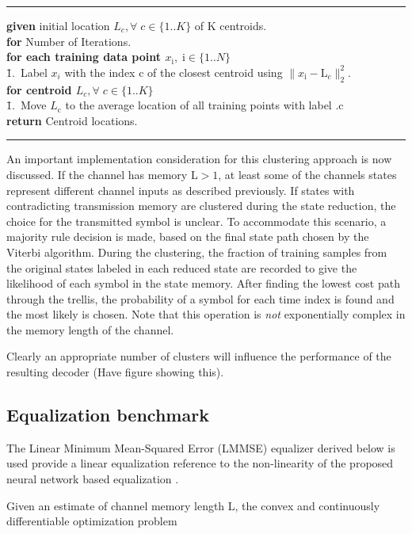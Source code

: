     \noindent\rule[10pt]{\textwidth}{0.4pt}
    {\footnotesize
    \begin{tabbing}
    {\bf given} initial location $L_c, \forall \;c  \in \{1..K\}$ of K centroids.\\
        {\textbf{for} Number of Iterations}.\\
         \qquad \= {\bf for each training data point $x_{\mathrm{i}}, \;\mathrm{i}  \in \{1..N\}$}\\
        \qquad \qquad \= 1.\ Label $x_i$ with the index c of the closest centroid using $\|x_{\mathrm{i}}- \text{L}_c\|^2_2$. \\
        \qquad \= {\bf for centroid $L_c, \forall \;c  \in \{1..K\}$}\\
                \qquad \qquad \= 1.\ Move $L_{\mathrm{c}}$ to the average location of all training points with label .c\\


        {\bf return} Centroid locations.
    \end{tabbing}}
    \noindent\rule[10pt]{\textwidth}{0.4pt}
    

\par
An important implementation consideration for this clustering approach is now discussed. If the channel has memory $\text{L}>1$, at least some of the channels states represent different channel inputs as described previously. If states with contradicting transmission memory are clustered during the state reduction, the choice for the transmitted symbol is unclear. To accommodate this scenario, a majority rule decision is made, based on the final state path chosen by the Viterbi algorithm. During the clustering, the fraction of training samples from the original states labeled in each reduced state are recorded to give the likelihood of each symbol in the state memory. After finding the lowest cost path through the trellis, the probability of a symbol for each time index is found and the most likely is chosen. Note that this operation is \emph{not} exponentially complex in the memory length of the channel.

\par 
Clearly an appropriate number of clusters will influence the performance of the resulting decoder (Have figure showing this).

\subsection{Equalization benchmark}
The Linear Minimum Mean-Squared Error (LMMSE) equalizer derived below is used provide a linear equalization reference to the non-linearity of the proposed neural network based equalization .
\par
Given an estimate of channel memory length L, the convex and continuously differentiable optimization problem 

